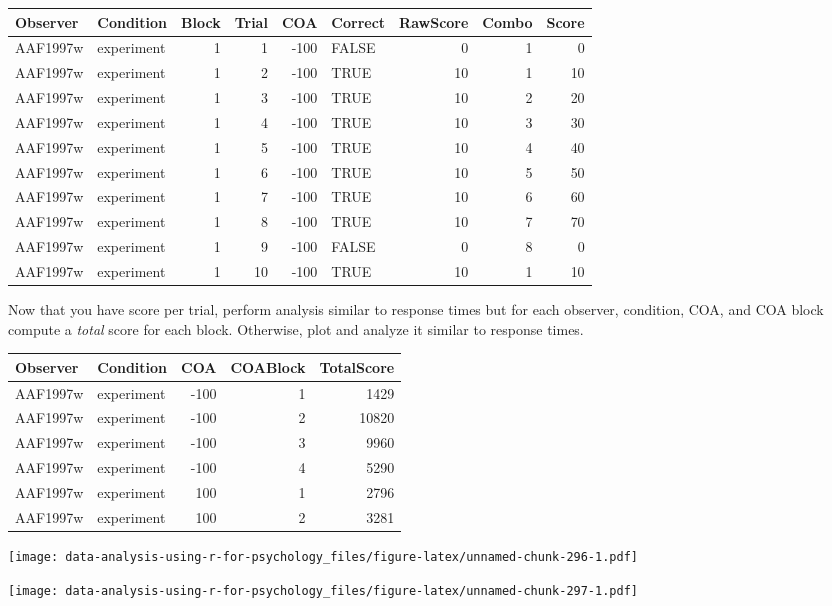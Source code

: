 \documentclass[
]{book}
\begin{document}
\begin{tabular}{l|l|r|r|r|l|r|r|r}
\hline
Observer & Condition & Block & Trial & COA & Correct & RawScore & Combo & Score\\
\hline
AAF1997w & experiment & 1 & 1 & -100 & FALSE & 0 & 1 & 0\\
\hline
AAF1997w & experiment & 1 & 2 & -100 & TRUE & 10 & 1 & 10\\
\hline
AAF1997w & experiment & 1 & 3 & -100 & TRUE & 10 & 2 & 20\\
\hline
AAF1997w & experiment & 1 & 4 & -100 & TRUE & 10 & 3 & 30\\
\hline
AAF1997w & experiment & 1 & 5 & -100 & TRUE & 10 & 4 & 40\\
\hline
AAF1997w & experiment & 1 & 6 & -100 & TRUE & 10 & 5 & 50\\
\hline
AAF1997w & experiment & 1 & 7 & -100 & TRUE & 10 & 6 & 60\\
\hline
AAF1997w & experiment & 1 & 8 & -100 & TRUE & 10 & 7 & 70\\
\hline
AAF1997w & experiment & 1 & 9 & -100 & FALSE & 0 & 8 & 0\\
\hline
AAF1997w & experiment & 1 & 10 & -100 & TRUE & 10 & 1 & 10\\
\hline
\end{tabular}

Now that you have score per trial, perform analysis similar to response times but for each observer, condition, COA, and COA block compute a \emph{total} score for each block. Otherwise, plot and analyze it similar to response times.

\begin{tabular}{l|l|r|r|r}
\hline
Observer & Condition & COA & COABlock & TotalScore\\
\hline
AAF1997w & experiment & -100 & 1 & 1429\\
\hline
AAF1997w & experiment & -100 & 2 & 10820\\
\hline
AAF1997w & experiment & -100 & 3 & 9960\\
\hline
AAF1997w & experiment & -100 & 4 & 5290\\
\hline
AAF1997w & experiment & 100 & 1 & 2796\\
\hline
AAF1997w & experiment & 100 & 2 & 3281\\
\hline
\end{tabular}

\texttt{[image: data-analysis-using-r-for-psychology\_files/figure-latex/unnamed-chunk-296-1.pdf]}

\texttt{[image: data-analysis-using-r-for-psychology\_files/figure-latex/unnamed-chunk-297-1.pdf]}
\end{document}
